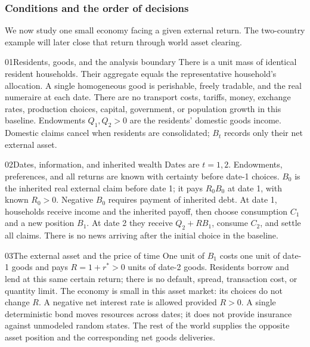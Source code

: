 \subsubsection{Conditions and the order of decisions}

We now study one small economy facing a given external return. The two-country
example will later close that return through world asset clearing.

\begin{modelsetup}[1]
\begin{modelcondition}{01}{Residents, goods, and the analysis boundary}
There is a unit mass of identical resident households. Their aggregate equals
the representative household's allocation. A single homogeneous good is
perishable, freely tradable, and the real numeraire at each date. There are
no transport costs, tariffs, money, exchange rates, production choices,
capital, government, or population growth in this baseline. Endowments
$Q_1,Q_2>0$ are the residents' domestic goods income. Domestic claims cancel
when residents are consolidated; $B_t$ records only their net external asset.
\end{modelcondition}
\end{modelsetup}

\begin{modelsetup}[1]
\begin{modelcondition}{02}{Dates, information, and inherited wealth}
Dates are $t=1,2$. Endowments, preferences, and all returns are known with
certainty before date-1 choices. $B_0$ is the inherited real external claim
before date 1; it pays $R_0B_0$ at date 1, with known $R_0>0$. Negative
$B_0$ requires payment of inherited debt. At date 1, households receive income
and the inherited payoff, then choose consumption $C_1$ and a new position
$B_1$. At date 2 they receive $Q_2+RB_1$, consume $C_2$, and settle all claims.
There is no news arriving after the initial choice in the baseline.
\end{modelcondition}
\end{modelsetup}

\begin{modelsetup}[1]
\begin{modelcondition}{03}{The external asset and the price of time}
One unit of $B_1$ costs one unit of date-1 goods and pays $R=1+r^*>0$ units
of date-2 goods. Residents borrow and lend at this same certain return;
there is no default, spread, transaction cost, or quantity limit. The economy
is small in this asset market: its choices do not change $R$. A negative
net interest rate is allowed provided $R>0$. A single deterministic bond
moves resources across dates; it does not provide insurance against
unmodeled random states. The rest of the world supplies the opposite asset
position and the corresponding net goods deliveries.
\end{modelcondition}
\end{modelsetup}

